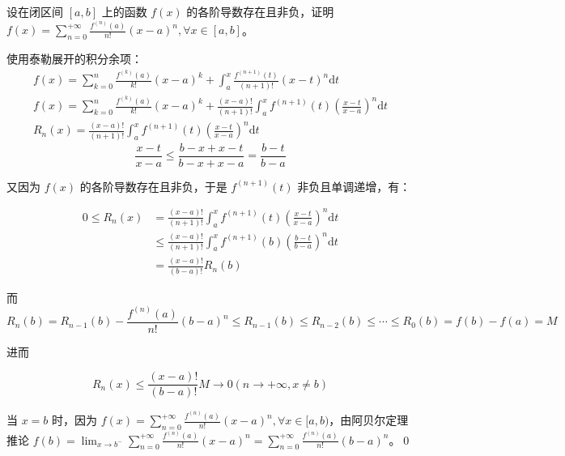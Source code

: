 \begin{ques}
	设在闭区间 $\displaystyle [ a,b]$ 上的函数 $\displaystyle f( x)$ 的各阶导数存在且非负，证明 $\displaystyle f( x) =\sum _{n=0}^{+\infty }\frac{f^{( n)}( a)}{n!}( x-a)^{n} ,\forall x\in [ a,b]$。
\end{ques}

使用泰勒展开的积分余项：
\begin{gather*}
	f( x) =\sum _{k=0}^{n}\frac{f^{( k)}( a)}{k!}( x-a)^{k} +\int _{a}^{x}\frac{f^{( n+1)}( t)}{( n+1) !}( x-t)^{n}\mathrm{d} t\\
	f( x) =\sum _{k=0}^{n}\frac{f^{( k)}( a)}{k!}( x-a)^{k} +\frac{( x-a) !}{( n+1) !}\int _{a}^{x} f^{( n+1)}( t)\left(\frac{x-t}{x-a}\right)^{n}\mathrm{d} t\\
	R_{n}( x) =\frac{( x-a) !}{( n+1) !}\int _{a}^{x} f^{( n+1)}( t)\left(\frac{x-t}{x-a}\right)^{n}\mathrm{d} t
\end{gather*}
\begin{equation*}
	\frac{x-t}{x-a} \leqslant \frac{b-x+x-t}{b-x+x-a} =\frac{b-t}{b-a}
\end{equation*}


又因为 $\displaystyle f( x)$ 的各阶导数存在且非负，于是 $\displaystyle f^{( n+1)}( t)$ 非负且单调递增，有：

\begin{align*}
	0\leqslant R_{n}( x) & =\frac{( x-a) !}{( n+1) !}\int _{a}^{x} f^{( n+1)}( t)\left(\frac{x-t}{x-a}\right)^{n}\mathrm{d} t\\
	& \leqslant \frac{( x-a) !}{( n+1) !}\int _{a}^{x} f^{( n+1)}( b)\left(\frac{b-t}{b-a}\right)^{n}\mathrm{d} t\\
	& =\frac{( x-a) !}{( b-a) !} R_{n}( b)
\end{align*}

而
\begin{equation*}
	R_{n}( b) =R_{n-1}( b) -\frac{f^{( n)}( a)}{n!}( b-a)^{n} \leqslant R_{n-1}( b) \leqslant R_{n-2}( b) \leqslant \cdots \leqslant R_{0}( b) =f( b) -f( a) =M
\end{equation*}


进而


\begin{equation*}
	R_{n}( x) \leqslant \frac{( x-a) !}{( b-a) !} M\rightarrow 0\left( n\rightarrow +\infty ,x\neq b\right)
\end{equation*}


当 $\displaystyle x=b$ 时，因为 $\displaystyle f( x) =\sum _{n=0}^{+\infty }\frac{f^{( n)}( a)}{n!}( x-a)^{n} ,\forall x\in [ a,b)$，由阿贝尔定理推论 $\displaystyle f( b) =\lim _{x\rightarrow b^{-}}\sum _{n=0}^{+\infty }\frac{f^{( n)}( a)}{n!}( x-a)^{n} =\sum _{n=0}^{+\infty }\frac{f^{( n)}( a)}{n!}( b-a)^{n}$。\qed 






